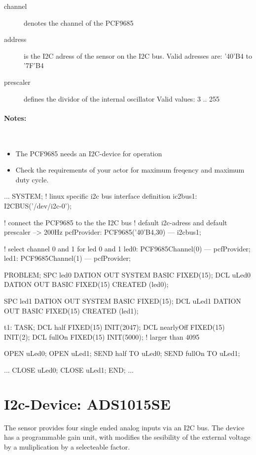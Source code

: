 \begin{description}
\item[channel] denotes the channel of the PCF9685
\item[address] is the I2C adress of the sensor on the I2C bus.
   Valid adresses are: '40'B4 to '7F'B4
\item[prescaler] defines the dividor of the internal oscillator
   Valid values: 3 .. 255
\end{description}

\paragraph{Notes:}\ 
\begin{itemize}
\item The PCF9685 needs an I2C-device for operation
\item Check the requirements of your actor for maximum freqency
    and maximum duty cycle.
\end{itemize}

\begin{PEARLCode}
...
SYSTEM;
   ! linux specific i2c bus interface definition
   ic2bus1: I2CBUS('/dev/i2c-0');

   ! connect the PCF9685 to the the I2C bus
   ! default i2c-adress and default prescaler --> 200Hz
   pcfProvider: PCF9685('40'B4,30) --- i2cbus1;

   ! select channel 0 and 1 for led 0 and 1
   led0: PCF9685Channel(0) --- pcfProvider;
   led1: PCF9685Channel(1) --- pcfProvider;


PROBLEM;
   SPC led0 DATION OUT SYSTEM BASIC FIXED(15);
   DCL uLed0 DATION OUT BASIC FIXED(15) CREATED (led0);

   SPC led1 DATION OUT SYSTEM BASIC FIXED(15);
   DCL uLed1 DATION OUT BASIC FIXED(15) CREATED (led1);

t1: TASK;
   DCL half FIXED(15) INIT(2047);
   DCL nearlyOff FIXED(15) INIT(2);
   DCL fullOn FIXED(15) INIT(5000); ! larger than 4095

   OPEN uLed0;
   OPEN uLed1;
   SEND half   TO uLed0;  
   SEND fullOn TO uLed1;  

...
   CLOSE uLed0;
   CLOSE uLed1;
END;
...
\end{PEARLCode}

\section{I2c-Device: ADS1015SE}
The sensor provides four single ended analog inputs via an I2C bus.
The device  has a programmable gain unit, with modifies the sesibility
of the external voltage by a muliplication by a selecteable factor.

